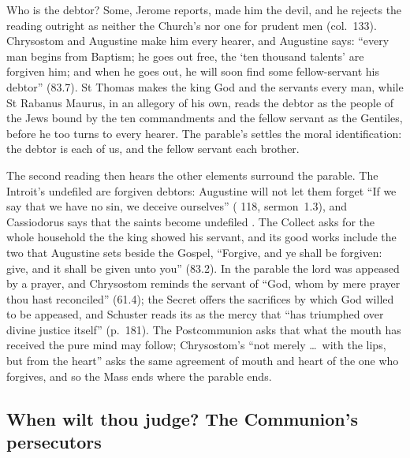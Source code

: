 Who is the debtor? Some, Jerome reports, made him the devil, and he rejects the
reading outright as neither the Church's nor one for prudent men (col.~133).
Chrysostom and Augustine make him every hearer, and Augustine says: ``every man begins from Baptism; he goes out
free, the `ten thousand talents' are forgiven him; and when he goes out, he will
soon find some fellow-servant his debtor'' (83.7). St Thomas makes the king God
and the servants every man, while St Rabanus Maurus, in an allegory of his own,
reads the debtor as the people of the Jews bound by the ten commandments and the
fellow servant as the Gentiles, before he too turns to every hearer. The
parable's  settles the moral identification: the
debtor is each of us, and the fellow servant each brother.

The second reading then hears the other elements surround the parable. The
Introit's undefiled are forgiven debtors: Augustine will not let them forget
``If we say that we have no sin, we deceive ourselves'' (
118, sermon~1.3), and Cassiodorus says that the saints become undefiled
. The Collect asks for the whole
household the  the king showed his servant, and its good
works include the two that Augustine sets beside the Gospel, ``Forgive, and ye
shall be forgiven: give, and it shall be given unto you'' (83.2). In the parable
the lord was appeased by a prayer, and Chrysostom reminds the servant of ``God,
whom by mere prayer thou hast reconciled'' (61.4); the Secret offers the
sacrifices by which God willed to be appeased, and Schuster reads its
 as the mercy that ``has triumphed over divine justice
itself'' (p.~181). The Postcommunion asks that what the mouth has received the
pure mind may follow; Chrysostom's ``not merely \dots\ with the lips, but from
the heart'' asks the same agreement of mouth and heart of the one who forgives,
and so the Mass ends where the parable ends.

\subsection{When wilt thou judge? The Communion's persecutors}

